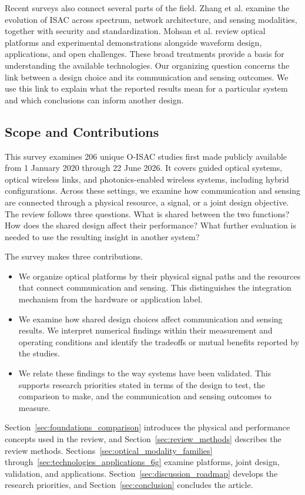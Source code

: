 Recent surveys also connect several parts of the field. Zhang et al.
\cite{Zhang2026ISACEvolution} examine the evolution of ISAC across spectrum,
network architecture, and sensing modalities, together with security and
standardization. Mohsan et al. \cite{Mohsan2026OISACReview} review optical
platforms and experimental demonstrations alongside waveform design,
applications, and open challenges. These broad treatments provide a basis for
understanding the available technologies. Our organizing question concerns
the link between a design choice and its communication and sensing outcomes.
We use this link to explain what the reported results mean for a particular
system and which conclusions can inform another design.

\subsection{Scope and Contributions}

This survey examines 206 unique O-ISAC studies first made publicly available
from 1 January 2020 through 22 June 2026. It covers guided optical systems,
optical wireless links, and photonics-enabled wireless systems, including
hybrid configurations. Across these settings, we examine how communication
and sensing are connected through a physical resource, a signal, or a joint
design objective. The review follows three questions. What is shared between
the two functions? How does the shared design affect their performance?
What further evaluation is needed to use the resulting insight in another
system?

The survey makes three contributions.
\begin{itemize}
\item We organize optical platforms by their physical signal paths and the
resources that connect communication and sensing. This distinguishes the
integration mechanism from the hardware or application label.

\item We examine how shared design choices affect communication and sensing
results. We interpret numerical findings within their measurement and
operating conditions and identify the tradeoffs or mutual benefits reported
by the studies.

\item We relate these findings to the way systems have been validated.
This supports research priorities stated in terms of the design to test,
the comparison to make, and the communication and sensing outcomes to
measure.
\end{itemize}

Section~\ref{sec:foundations_comparison} introduces the physical and performance
concepts used in the review, and Section~\ref{sec:review_methods} describes the
review methods. Sections~\ref{sec:optical_modality_families}
through~\ref{sec:technologies_applications_6g} examine platforms, joint design,
validation, and applications. Section~\ref{sec:discussion_roadmap} develops the
research priorities, and Section~\ref{sec:conclusion} concludes the article.

\FloatBarrier

